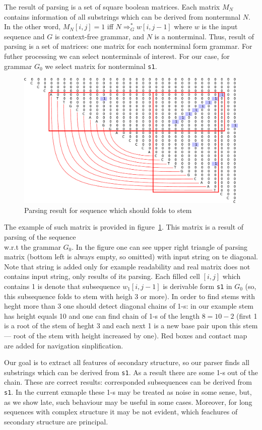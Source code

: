 \documentclass[a4paper,twoside]{article}
\begin{document}
\noindent The result of parsing is a set of square boolean matrices. 
Each matrix $M_N$ contains information of all substrings which can be derived from nontermnal $N$.
In the other word, $M_N[i,j]=1$ iff $N \Rightarrow^*_G w[i,j-1]$ where $w$ is the input sequence and $G$ is context-free grammar, and $N$ is a nonterminal.
Thus, result of parsing is a set of matrices: one matrix for each nonterminal form grammar.
For futher processing we can select nonterminals of interest.
For our case, for grammar $G_0$ we select matrix for nonterminal \verb|s1|.

\begin{figure}
\centering
\includegraphics[width=.5\textwidth]{figures/4.pdf}
\caption{Parsing result for sequence which should folds to stem}
\label{fig:matrix-simple-stem}
\end{figure}

The example of such matrix is provided in figure~\ref{fig:matrix-simple-stem}.
This matrix is a result of parsing of the sequence {  \\} w.r.t the grammar $G_0$.
In the figure one can see upper right triangle of parsing matrix (bottom left is always empty, so omitted) with input string on te diagonal.
Note that string is added only for example readability and real matrix does not contains input string, only results of its parsing.
Each filled cell $[i,j]$ which contains 1 is denote that subsequence $w_1[i,j-1]$ is derivable form \verb|s1| in $G_0$ (so, this subsequence folds to stem with heigh 3 or more).
In order to find stems with heght more than 3 one should detect diagonal chains of 1-s: in our example stem has height equals 10 and one can find chain of 1-s of the length $8=10-2$ (first 1 is a root of the stem of heght 3 and each next 1 is a new base pair upon this stem --- root of the stem with height increased by one).
Red boxes and contact map are added for navigation sinplification.

Our goal is to extract all features of secondary structure, so our parser finds all substrings which can be derived from \verb|s1|.
As a result there are some 1-s out of the chain.
These are correct results: corresponded subsequences can be derived from \verb|s1|. 
In the current exmaple these 1-s may be treated as noise in some sense, but, as we show late, such behaviour may be useful in some cases.
Moreover, for long sequences with complex structure it may be not evident, which feachures of secondary structure are principal.
\end{document}
